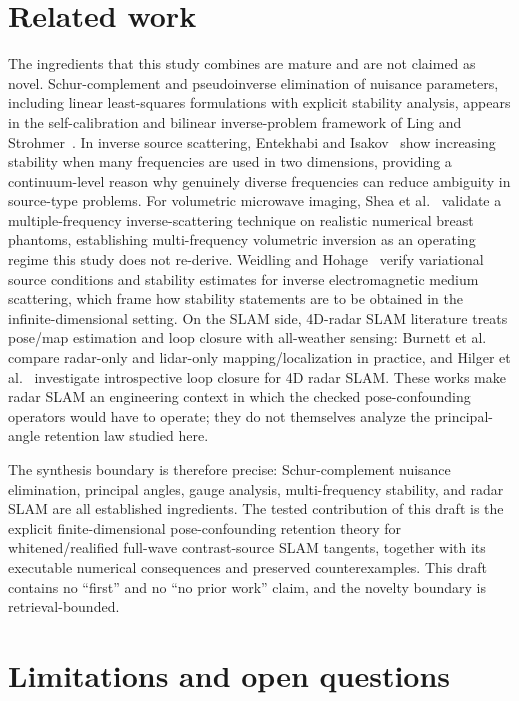 \documentclass[12pt]{article}
\begin{document}
\section{Related work}\label{sec:related}

The ingredients that this study combines are mature and are not claimed as
novel. Schur-complement and pseudoinverse elimination of nuisance parameters,
including linear least-squares formulations with explicit stability analysis,
appears in the self-calibration and bilinear inverse-problem framework of
Ling and Strohmer~\cite{ling}. In inverse source scattering, Entekhabi and
Isakov~\cite{entekhabi} show increasing stability when many frequencies are
used in two dimensions, providing a continuum-level reason why genuinely
diverse frequencies can reduce ambiguity in source-type problems. For
volumetric microwave imaging, Shea et al.\ \cite{shea} validate a
multiple-frequency inverse-scattering technique on realistic numerical breast
phantoms, establishing multi-frequency volumetric inversion as an operating
regime this study does not re-derive. Weidling and Hohage~\cite{weidling}
verify variational source conditions and stability estimates for inverse
electromagnetic medium scattering, which frame how stability statements are
to be obtained in the infinite-dimensional setting. On the SLAM side,
4D-radar SLAM literature treats pose/map estimation and loop closure with
all-weather sensing: Burnett et al.\ \cite{burnett} compare radar-only and
lidar-only mapping/localization in practice, and Hilger et al.\ \cite{hilger}
investigate introspective loop closure for 4D radar SLAM. These works make
radar SLAM an engineering context in which the checked pose-confounding
operators would have to operate; they do not themselves analyze the
principal-angle retention law studied here.

The synthesis boundary is therefore precise: Schur-complement nuisance
elimination, principal angles, gauge analysis, multi-frequency stability, and
radar SLAM are all established ingredients. The tested contribution of this
draft is the explicit finite-dimensional pose-confounding retention theory for
whitened/realified full-wave contrast-source SLAM tangents, together with its
executable numerical consequences and preserved counterexamples. This draft
contains no ``first'' and no ``no prior work'' claim, and the novelty boundary
is retrieval-bounded.

\section{Limitations and open questions}\label{sec:limits}
\end{document}
